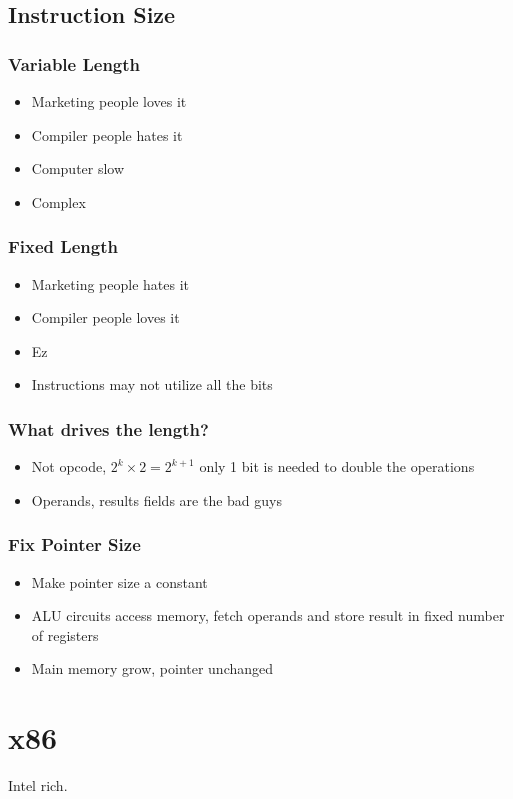 \documentclass[11pt]{article}
\begin{document}
\subsection{Instruction Size}
\label{sec:org2a3d39b}

\subsubsection{Variable Length}
\label{sec:orged5f3d7}

\begin{itemize}
\item Marketing people loves it
\item Compiler people hates it
\item Computer slow
\item Complex
\end{itemize}

\subsubsection{Fixed Length}
\label{sec:org4389942}

\begin{itemize}
\item Marketing people hates it
\item Compiler people loves it
\item Ez
\item Instructions may not utilize all the bits
\end{itemize}

\subsubsection{What drives the length?}
\label{sec:orge43dcf3}

\begin{itemize}
\item Not opcode, \(2^k \times 2 = 2^{k+1}\) only 1 bit is needed to double the operations
\item Operands, results fields are the bad guys
\end{itemize}

\subsubsection{Fix Pointer Size}
\label{sec:org1d659d2}

\begin{itemize}
\item Make pointer size a constant
\item ALU circuits access memory, fetch operands and store result in fixed number of registers
\item Main memory grow, pointer unchanged
\end{itemize}

\section{x86}
\label{sec:orgabb3319}

Intel rich.
\end{document}
